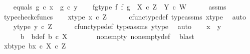 \begin{isabellebody}
\ \ \isamarkupfalse%
\ equals{\isacharcolon}{\kern0pt}\ {\isachardoublequoteopen}g\ {\isasymcirc}\isactrlsub c\ x\ {\isacharequal}{\kern0pt}\ g\ {\isasymcirc}\isactrlsub c\ y{\isachardoublequoteclose}\isanewline
\ \ \isamarkupfalse%
\ fg{\isacharunderscore}{\kern0pt}type{\isacharcolon}{\kern0pt}\ {\isachardoublequoteopen}f\ {\isasymtimes}\isactrlsub f\ g\ {\isacharcolon}{\kern0pt}\ X\ {\isasymtimes}\isactrlsub c\ Z\ {\isasymrightarrow}\ Y\ {\isasymtimes}\isactrlsub c\ W{\isachardoublequoteclose}\isanewline
\ \ \ \ \isamarkupfalse%
\ assms\ \isamarkupfalse%
\ typecheck{\isacharunderscore}{\kern0pt}cfuncs\isanewline
\ \ \isamarkupfalse%
\ x{\isacharunderscore}{\kern0pt}type{}{\isacharcolon}{\kern0pt}\ {\isachardoublequoteopen}x\ {\isasymin}\isactrlsub c\ Z{\isachardoublequoteclose}\isanewline
\ \ \ \ \isamarkupfalse%
\ cfunc{\isacharunderscore}{\kern0pt}type{\isacharunderscore}{\kern0pt}def\ type{\isacharunderscore}{\kern0pt}assms{\isacharparenleft}{\kern0pt}{}{\isacharparenright}{\kern0pt}\ x{\isacharunderscore}{\kern0pt}type\ \isamarkupfalse%
\ auto\isanewline
\ \ \isamarkupfalse%
\ y{\isacharunderscore}{\kern0pt}type{}{\isacharcolon}{\kern0pt}\ {\isachardoublequoteopen}y\ {\isasymin}\isactrlsub c\ Z{\isachardoublequoteclose}\isanewline
\ \ \ \ \isamarkupfalse%
\ cfunc{\isacharunderscore}{\kern0pt}type{\isacharunderscore}{\kern0pt}def\ type{\isacharunderscore}{\kern0pt}assms{\isacharparenleft}{\kern0pt}{}{\isacharparenright}{\kern0pt}\ y{\isacharunderscore}{\kern0pt}type\ \isamarkupfalse%
\ auto\isanewline
\ \ \isamarkupfalse%
\ {\isachardoublequoteopen}x\ {\isacharequal}{\kern0pt}\ y{\isachardoublequoteclose}\isanewline
\ \ \isamarkupfalse%
\ {\isacharminus}{\kern0pt}\ \isanewline
\ \ \ \ \isamarkupfalse%
\ b\ \ b{\isacharunderscore}{\kern0pt}def{\isacharcolon}{\kern0pt}\ {\isachardoublequoteopen}b\ {\isasymin}\isactrlsub c\ X{\isachardoublequoteclose}\isanewline
\ \ \ \ \ \ \isamarkupfalse%
\ nonempty{\isacharparenleft}{\kern0pt}{}{\isacharparenright}{\kern0pt}\ nonempty{\isacharunderscore}{\kern0pt}def\ \isamarkupfalse%
\ blast\isanewline
\ \ \ \ \isamarkupfalse%
\ xb{\isacharunderscore}{\kern0pt}type{\isacharcolon}{\kern0pt}\ {\isachardoublequoteopen}{\isasymlangle}b{\isacharcomma}{\kern0pt}x{\isasymrangle}\ {\isasymin}\isactrlsub c\ X\ {\isasymtimes}\isactrlsub c\ Z{\isachardoublequoteclose}\isanewline

\end{isabellebody}

